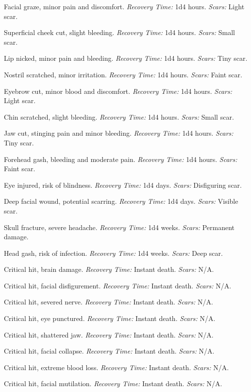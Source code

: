\begin{description}[labelwidth=1.5em, leftmargin=*, itemsep=0.4em]
    \item[1 -] Facial graze, minor pain and discomfort. \textit{Recovery Time:} 1d4 hours. \textit{Scars:} Light scar.
    \item[2 -] Superficial cheek cut, slight bleeding. \textit{Recovery Time:} 1d4 hours. \textit{Scars:} Small scar.
    \item[3 -] Lip nicked, minor pain and bleeding. \textit{Recovery Time:} 1d4 hours. \textit{Scars:} Tiny scar.
    \item[4 -] Nostril scratched, minor irritation. \textit{Recovery Time:} 1d4 hours. \textit{Scars:} Faint scar.
    \item[5 -] Eyebrow cut, minor blood and discomfort. \textit{Recovery Time:} 1d4 hours. \textit{Scars:} Light scar.
    \item[6 -] Chin scratched, slight bleeding. \textit{Recovery Time:} 1d4 hours. \textit{Scars:} Small scar.
    \item[7 -] Jaw cut, stinging pain and minor bleeding. \textit{Recovery Time:} 1d4 hours. \textit{Scars:} Tiny scar.
    \item[8 -] Forehead gash, bleeding and moderate pain. \textit{Recovery Time:} 1d4 hours. \textit{Scars:} Faint scar.
    \item[9 -] Eye injured, risk of blindness. \textit{Recovery Time:} 1d4 days. \textit{Scars:} Disfiguring scar.
    \item[10 -] Deep facial wound, potential scarring. \textit{Recovery Time:} 1d4 days. \textit{Scars:} Visible scar.
    \item[11 -] Skull fracture, severe headache. \textit{Recovery Time:} 1d4 weeks. \textit{Scars:} Permanent damage.
    \item[12 -] Head gash, risk of infection. \textit{Recovery Time:} 1d4 weeks. \textit{Scars:} Deep scar.
    \item[13 -] Critical hit, brain damage. \textit{Recovery Time:} Instant death. \textit{Scars:} N/A.
    \item[14 -] Critical hit, facial disfigurement. \textit{Recovery Time:} Instant death. \textit{Scars:} N/A.
    \item[15 -] Critical hit, severed nerve. \textit{Recovery Time:} Instant death. \textit{Scars:} N/A.
    \item[16 -] Critical hit, eye punctured. \textit{Recovery Time:} Instant death. \textit{Scars:} N/A.
    \item[17 -] Critical hit, shattered jaw. \textit{Recovery Time:} Instant death. \textit{Scars:} N/A.
    \item[18 -] Critical hit, facial collapse. \textit{Recovery Time:} Instant death. \textit{Scars:} N/A.
    \item[19 -] Critical hit, extreme blood loss. \textit{Recovery Time:} Instant death. \textit{Scars:} N/A.
    \item[20 -] Critical hit, facial mutilation. \textit{Recovery Time:} Instant death. \textit{Scars:} N/A.
\end{description}

